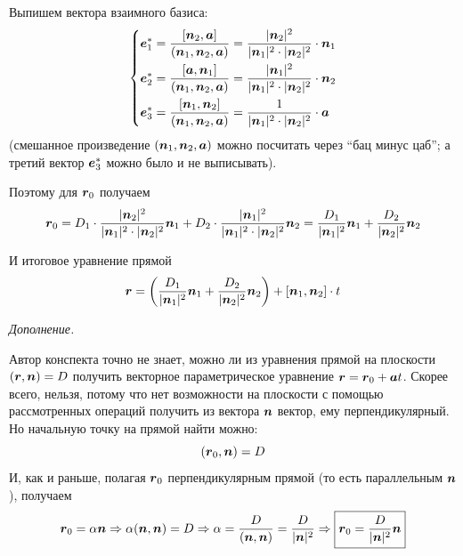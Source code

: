 \documentclass[a4paper,12pt]{article}
\begin{document}
\begin{solution}
\begin{enumerate}
        Выпишем вектора взаимного базиса:
        \[
          \left\{
          \begin{aligned}
            &\boldsymbol e_1^* = \frac{[\boldsymbol n_2, \boldsymbol a]}{(\boldsymbol n_1, \boldsymbol n_2, \boldsymbol a)} = \frac{|\boldsymbol n_2|^2}{|\boldsymbol n_1|^2 \cdot |\boldsymbol n_2|^2} \cdot \boldsymbol n_1\\
            &\boldsymbol e_2^* = \frac{[\boldsymbol a, \boldsymbol n_1]}{(\boldsymbol n_1, \boldsymbol n_2, \boldsymbol a)} = \frac{|\boldsymbol n_1|^2}{|\boldsymbol n_1|^2 \cdot |\boldsymbol n_2|^2} \cdot \boldsymbol n_2\\
            &\boldsymbol e_3^* = \frac{[\boldsymbol n_1, \boldsymbol n_2]}{(\boldsymbol n_1, \boldsymbol n_2, \boldsymbol a)} = \frac{1}{|\boldsymbol n_1|^2 \cdot |\boldsymbol n_2|^2} \cdot \boldsymbol a
          \end{aligned}
          \right.
        \]
        (смешанное произведение $(\boldsymbol n_1, \boldsymbol n_2, \boldsymbol a)$ можно посчитать через ``бац минус цаб''; а третий вектор $\boldsymbol e_3^*$ можно было и не выписывать).
        
        Поэтому для $\boldsymbol r_0$ получаем
        \[
          \boldsymbol r_0
          = D_1 \cdot \frac{|\boldsymbol n_2|^2}{|\boldsymbol n_1|^2 \cdot |\boldsymbol n_2|^2} \boldsymbol n_1 + D_2 \cdot \frac{|\boldsymbol n_1|^2}{|\boldsymbol n_1|^2 \cdot |\boldsymbol n_2|^2} \boldsymbol n_2
          = \frac{D_1}{|\boldsymbol n_1|^2} \boldsymbol n_1 + \frac{D_2}{|\boldsymbol n_2|^2} \boldsymbol n_2
        \]
        
        И итоговое уравнение прямой
        \[
          \boldsymbol r = \left(\frac{D_1}{|\boldsymbol n_1|^2} \boldsymbol n_1 + \frac{D_2}{|\boldsymbol n_2|^2} \boldsymbol n_2\right) + [\boldsymbol n_1, \boldsymbol n_2] \cdot t
        \]
        
        \bigskip
        
        \emph{Дополнение.}
        
        Автор конспекта точно не знает, можно ли из уравнения прямой на плоскости $(\bds r, \bds n) \hm= D$ получить векторное параметрическое уравнение $\bds r \hm= \bds r_0 \hm+ \bds a t$.
        Скорее всего, нельзя, потому что нет возможности на плоскости с помощью рассмотренных операций получить из вектора $\boldsymbol n$ вектор, ему перпендикулярный.
        Но начальную точку на прямой найти можно:
        \[
          (\boldsymbol r_0, \boldsymbol n) = D
        \]
        И, как и раньше, полагая $\boldsymbol r_0$ перпендикулярным прямой (то есть параллельным $\boldsymbol n$), получаем
        \[
          \boldsymbol r_0 = \alpha \boldsymbol n
          \Rightarrow \alpha (\boldsymbol n, \boldsymbol n) = D
          \Rightarrow \alpha = \frac{D}{(\boldsymbol n, \boldsymbol n)} = \frac{D}{|\boldsymbol n|^2} 
          \Rightarrow \boxed{\boldsymbol r_0 = \frac{D}{|\boldsymbol n|^2} \boldsymbol n}
        \]
    \end{enumerate}
  \end{solution}
\end{document}

